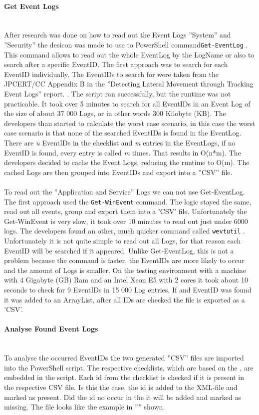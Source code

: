 \paragraph{Get Event Logs}\ \\
After research was done on how to read out the Event Logs ''System'' and ''Security'' the desicon was made to use to PowerShell command\lstinline|Get-EventLog| \cite{Get-EventLogs}. This command allows to read out the whole EventLog by the LogName or also to search after a specific EventID. The first approach was to search for each EventID individually. The EventIDs to search for were taken from the JPCERT/CC Appendix B in the ''Detecting Lateral Movement through Tracking Event Logs'' report. \cite{JPCERTDetectingLateralMovement}. The script ran successfully, but the runtime was not practicable. It took over 5 minutes to search for all EventIDs in an Event Log of the size of about 37 000 Logs, or  in other words 300 Kilobyte (KB). The developers than started to calculate the worst case scenario, in this case the worst case scenario is that none of the searched EventIDs is found in the EventLog. There are \textit{n} EventIDs in the checklist and \textit{m} entries in the EventLogs, if no EventID is found, every entry is called \textit{m} times. That results in O(n*m). The developers decided to cache the Event Logs, reducing the runtime to O(m). The cached Logs are then grouped into EventIDs and export into a ''CSV'' file. \ \\
\ \\
To read out the ''Application and Service'' Logs we can not use Get-EventLog. The first approach used the \lstinline|Get-WinEvent| \cite{Get-WinEvent} command. The logic stayed the same, read out all events, group and export them into a 'CSV' file. Unfortunately the Get-WinEvent is very slow, it took over 10 minutes to read out just under 6000 logs.
The developers found an other, much quicker command called \lstinline|wevtutil| \cite{wevtutil}. Unfortunately it is not quite simple to read out all Logs, for that reason each EventID will be searched if it appeared. Unlike Get-EventLog, this is not a problem because the command is faster, the EventIDs are more likely to occur and the amount of Logs is smaller. On the testing environment with a machine with 4 Gigabyte (GB) Ram and an Intel Xeon E5 with 2 cores it took about 10 seconds to check for 9 EventIDs in 15 000 Log entries. If and EventID was found it was added to an ArrayList, after all IDs are checked the file is exported as a 'CSV'.
\paragraph{Analyse Found Event Logs} \ \\
To analyse the occurred EventIDs the two generated ''CSV'' files are imported into the PowerShell script. The respective checklists, which are based on the , are embedded in the script. Each id from the checklist is checked if it is present in the respective CSV file. Is this the case, the id is added to the XML-file and marked as present. Did the id no occur in the it will be added and marked as missing. The file looks like the example in '''' shown.
\clearpage

